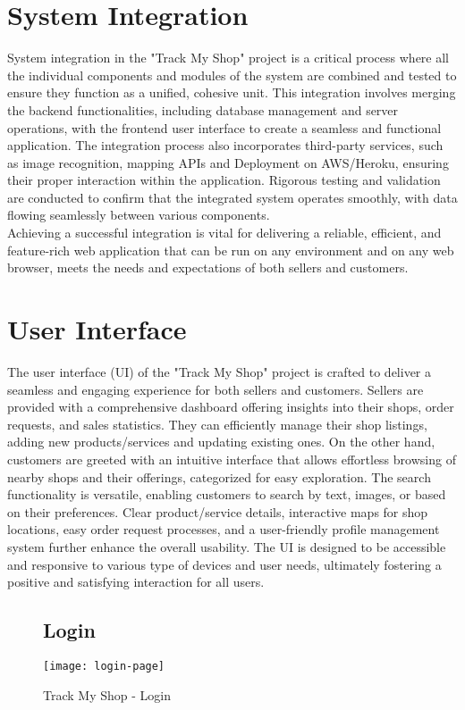 \section{System Integration}
System integration in the "Track My Shop" project is a critical process where all the individual components and modules of the system are combined and tested to ensure they function as a unified, cohesive unit. This integration involves merging the backend functionalities, including database management and server operations, with the frontend user interface to create a seamless and functional application. The integration process also incorporates third-party services, such as image recognition, mapping APIs and Deployment on AWS/Heroku, ensuring their proper interaction within the application. Rigorous testing and validation are conducted to confirm that the integrated system operates smoothly, with data flowing seamlessly between various components.\\
Achieving a successful integration is vital for delivering a reliable, efficient, and feature-rich web application that can be run on any environment and on any web browser, meets the needs and expectations of both sellers and customers. 

\section{User Interface}
The user interface (UI) of the "Track My Shop" project is crafted to deliver a seamless and engaging experience for both sellers and customers. Sellers are provided with a comprehensive dashboard offering insights into their shops, order requests, and sales statistics. They can efficiently manage their shop listings, adding new products/services and updating existing ones. On the other hand, customers are greeted with an intuitive interface that allows effortless browsing of nearby shops and their offerings, categorized for easy exploration. The search functionality is versatile, enabling customers to search by text, images, or based on their preferences. Clear product/service details, interactive maps for shop locations, easy order request processes, and a user-friendly profile management system further enhance the overall usability. The UI is designed to be accessible and responsive to various type of devices and user needs, ultimately fostering a positive and satisfying interaction for all users.
\newpage

\begin{figure}[h]
	\subsection{Login\\}
	\centering
	\texttt{[image: login-page]}
	\caption{Track My Shop - Login}
\end{figure}

